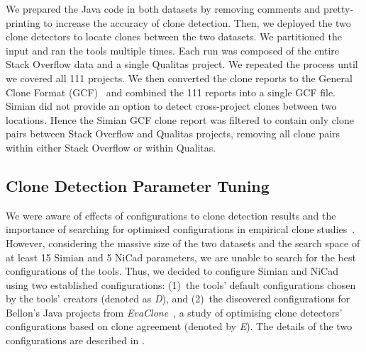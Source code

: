 \documentclass[sigconf,review, anonymous]{acmart}
\begin{document}
We prepared the Java code in both datasets by removing comments and
pretty-printing to increase the accuracy of clone detection. Then, we
deployed the two clone detectors to locate clones between the two
datasets.  We partitioned the input and ran the tools multiple
times. Each run was composed of the entire Stack Overflow data and a
single Qualitas project. We repeated the process until we covered all
111 projects.  We then converted the clone reports to the General
Clone Format (GCF)~\cite{Wang2013} and combined the 111 reports into a
single GCF file.  Simian did not provide an option to detect
cross-project clones between two locations. Hence the Simian GCF clone
report was filtered to contain only clone pairs between Stack Overflow
and Qualitas projects, removing all clone pairs within either Stack
Overflow or within Qualitas. 

\subsection{Clone Detection Parameter Tuning}

We were aware of effects of configurations to clone detection results
and the importance of searching for optimised configurations in
empirical clone
studies~\cite{Svajlenko2014,Wang2014,cr2016ssbse,Ragkhitwetsagul2016}. However,
considering the massive size of the two datasets and the search space
of at least 15 Simian and 5 NiCad parameters, we are unable to search
for the best configurations of the tools. Thus, we decided to
configure Simian and NiCad using two established configurations:
(1)~the tools' default configurations chosen by the tools' creators
(denoted as \textit{D}), and (2)~the discovered configurations for
Bellon's Java projects from \textit{EvaClone}~\cite{Wang2013}, a study
of optimising clone detectors' configurations based on clone agreement
(denoted by \textit{E}). The details of the two configurations are
described in .
\end{document}
